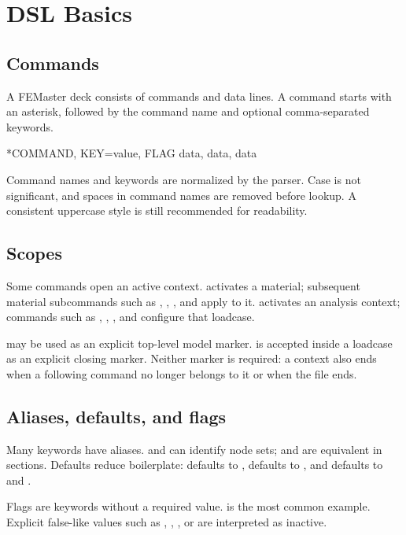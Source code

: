\chapter{DSL Basics}

\section{Commands}

A FEMaster deck consists of commands and data lines. A command starts with an asterisk, followed by the command name and optional comma-separated keywords.

\begin{syntax}
*COMMAND, KEY=value, FLAG
data, data, data
\end{syntax}

Command names and keywords are normalized by the parser. Case is not significant, and spaces in command names are removed before lookup. A consistent uppercase style is still recommended for readability.

\section{Scopes}

Some commands open an active context.  activates a material; subsequent material subcommands such as , , , and  apply to it.  activates an analysis context; commands such as , , , and  configure that loadcase.

 may be used as an explicit top-level model marker.  is accepted inside a loadcase as an explicit closing marker. Neither marker is required: a context also ends when a following command no longer belongs to it or when the file ends.

\section{Aliases, defaults, and flags}

Many keywords have aliases.  and  can identify node sets;  and  are equivalent in sections. Defaults reduce boilerplate:  defaults to ,  defaults to , and  defaults to  and .

Flags are keywords without a required value.  is the most common example. Explicit false-like values such as , , , or  are interpreted as inactive.

